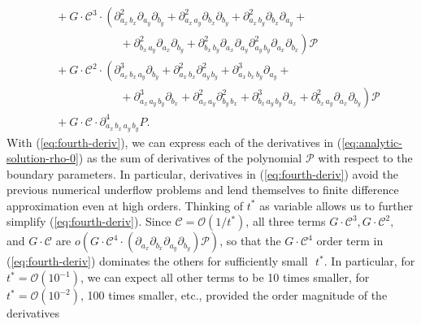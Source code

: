 \documentclass[10pt]{article}
\begin{document}
\begin{align}
                                                                                             &\,\, + G \cdot \mathcal{C}^3 \cdot \left( \partial^2_{a_x\, b_x} \partial_{a_y} \partial_{b_y} + \partial^2_{a_x\, a_y} \partial_{b_x} \partial_{b_y} + \partial^2_{a_x\, b_y} \partial_{b_x} \partial_{a_y} + \right. \nonumber \\
                                                                                             & \left. \qquad\qquad\qquad +\partial^2_{b_x\, a_y} \partial_{a_x} \partial_{b_y} + \partial^2_{b_x\, b_y} \partial_{a_x} \partial_{a_y} \partial^2_{a_y\, b_y} \partial_{a_x} \partial_{b_x} \right) \mathcal{P} \nonumber \\
                                                                                             &\,\, + G \cdot \mathcal{C}^2 \cdot \left( \partial^3_{a_x\,b_x\,a_y} \partial_{b_y} + \partial^2_{a_x\,b_x}\partial^2_{a_y\,b_y} + \partial^3_{a_x\,b_x\,b_y}\partial_{a_y}  + \right. \nonumber \\
                                                                                             & \left. \qquad\qquad\qquad + \partial^3_{a_x\,a_y\,b_y} \partial_{b_x} + \partial^2_{a_x\,a_y} \partial^2_{b_y\,b_x} + \partial^3_{b_x\,a_y\,b_y}\partial_{a_x} + \partial^2_{b_x\,a_y}\partial_{a_x}\partial_{b_y} \right) \mathcal{P} \nonumber \\
  &\,\, + G \cdot \mathcal{C} \cdot \partial^4_{a_x\,b_x\,a_y\,b_y} P. \label{eq:fourth-deriv}
\end{align}
With (\ref{eq:fourth-deriv}), we can express each of the derivatives
in (\ref{eq:analytic-solution-rho-0}) as the sum of derivatives of the
polynomial $\mathcal{P}$ with respect to the boundary parameters. In
particular, derivatives in (\ref{eq:fourth-deriv}) avoid the previous
numerical underflow problems and lend themselves to finite difference
approximation even at high orders. Thinking of $t^{*}$ as variable
allows us to further simplify (\ref{eq:fourth-deriv}). Since
$\mathcal{C} = \mathcal{O}(1/t^{*})$, all three terms
$G\cdot \mathcal{C}^3, G\cdot \mathcal{C}^2,$ and $G\cdot \mathcal{C}$
are
$o\left( G\cdot \mathcal{C}^4 \cdot \left(\partial_{a_x}\partial_{b_x}
    \partial_{a_y}\partial_{b_y} \right)\mathcal{P} \right)$, so that
the $G\cdot \mathcal{C}^4$ order term in (\ref{eq:fourth-deriv})
dominates the others for sufficiently small $\,\,t^{*}$. In
particular, for $t^* = \mathcal{O}(10^{-1})$, we can expect all other
terms to be 10 times smaller, for $t^* = \mathcal{O}(10^{-2})$, 100
times smaller, etc., provided the order magnitude of the derivatives
\end{document}
